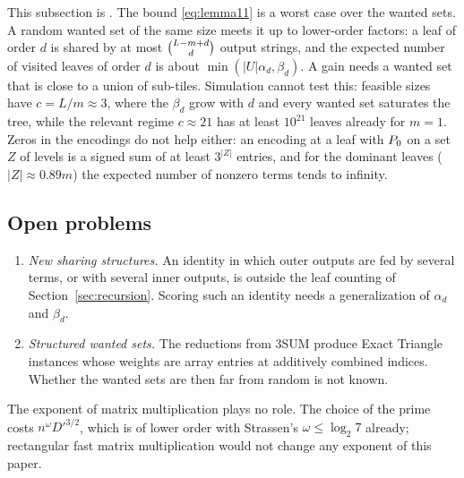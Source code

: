 This subsection is \nf.  The bound \eqref{eq:lemma11} is a worst case over the wanted sets.  A random
wanted set of the same size meets it up to lower-order factors: a leaf of
order \(d\) is shared by at most \(\binom{L-m+d}{d}\) output strings, and the
expected number of visited leaves of order \(d\) is about
\(\min(|U|\alpha_d,\beta_d)\).  A gain needs a wanted set that is close to a
union of sub-tiles.  Simulation cannot test this: feasible sizes have
\(c=L/m\approx3\), where the \(\beta_d\) grow with \(d\) and every wanted set
saturates the tree, while the relevant regime \(c\approx21\) has at least
\(10^{21}\) leaves already for \(m=1\).  Zeros in the encodings do not help
either: an encoding at a leaf with \(P_{0}\) on a set \(Z\) of levels is a signed
sum of at least \(3^{|Z|}\) entries, and for the dominant leaves
(\(|Z|\approx0.89m\)) the expected number of nonzero terms tends to infinity.

\subsection{Open problems}

\begin{enumerate}
\item \emph{New sharing structures.}  An identity in which outer outputs are
  fed by several terms, or with several inner outputs, is outside the leaf
  counting of Section~\ref{sec:recursion}.  Scoring such an identity needs a
  generalization of \(\alpha_d\) and \(\beta_d\).
\item \emph{Structured wanted sets.}  The reductions from 3SUM produce Exact
  Triangle instances whose weights are array entries at additively combined
  indices.  Whether the wanted sets are then far from random is not known.
\end{enumerate}

\begin{remark}[\nf]
The exponent of matrix multiplication plays no role.  The choice of the prime
costs \(n^{\omega}D'^{3/2}\), which is of lower order with Strassen's
\(\omega\le\log_2 7\) already; rectangular fast matrix multiplication would not
change any exponent of this paper.
\end{remark}
